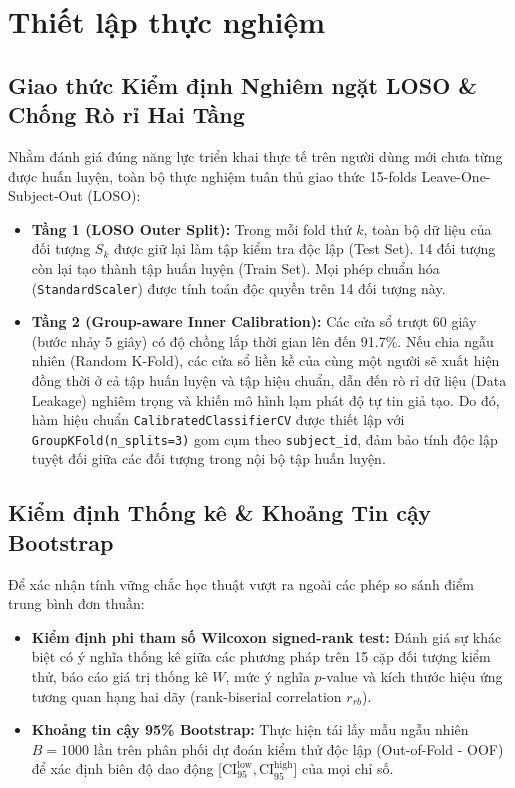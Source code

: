 \documentclass[conference]{IEEEtran}
\begin{document}
\section{Thiết lập thực nghiệm}

\subsection{Giao thức Kiểm định Nghiêm ngặt LOSO \& Chống Rò rỉ Hai Tầng}
Nhằm đánh giá đúng năng lực triển khai thực tế trên người dùng mới chưa từng được huấn luyện, toàn bộ thực nghiệm tuân thủ giao thức 15-folds Leave-One-Subject-Out (LOSO):
\begin{itemize}
    \item \textbf{Tầng 1 (LOSO Outer Split):} Trong mỗi fold thứ $k$, toàn bộ dữ liệu của đối tượng $S_k$ được giữ lại làm tập kiểm tra độc lập (Test Set). 14 đối tượng còn lại tạo thành tập huấn luyện (Train Set). Mọi phép chuẩn hóa (\texttt{StandardScaler}) được tính toán độc quyền trên 14 đối tượng này.
    \item \textbf{Tầng 2 (Group-aware Inner Calibration):} Các cửa sổ trượt 60 giây (bước nhảy 5 giây) có độ chồng lắp thời gian lên đến 91.7\%. Nếu chia ngẫu nhiên (Random K-Fold), các cửa sổ liền kề của cùng một người sẽ xuất hiện đồng thời ở cả tập huấn luyện và tập hiệu chuẩn, dẫn đến rò rỉ dữ liệu (Data Leakage) nghiêm trọng và khiến mô hình lạm phát độ tự tin giả tạo. Do đó, hàm hiệu chuẩn \texttt{CalibratedClassifierCV} được thiết lập với \texttt{GroupKFold(n\_splits=3)} gom cụm theo \texttt{subject\_id}, đảm bảo tính độc lập tuyệt đối giữa các đối tượng trong nội bộ tập huấn luyện.
\end{itemize}

\subsection{Kiểm định Thống kê \& Khoảng Tin cậy Bootstrap}
Để xác nhận tính vững chắc học thuật vượt ra ngoài các phép so sánh điểm trung bình đơn thuần:
\begin{itemize}
    \item \textbf{Kiểm định phi tham số Wilcoxon signed-rank test:} Đánh giá sự khác biệt có ý nghĩa thống kê giữa các phương pháp trên 15 cặp đối tượng kiểm thử, báo cáo giá trị thống kê $W$, mức ý nghĩa $p$-value và kích thước hiệu ứng tương quan hạng hai dãy (rank-biserial correlation $r_{rb}$).
    \item \textbf{Khoảng tin cậy 95\% Bootstrap:} Thực hiện tái lấy mẫu ngẫu nhiên $B = 1000$ lần trên phân phối dự đoán kiểm thử độc lập (Out-of-Fold - OOF) để xác định biên độ dao động [$\text{CI}_{95}^{\text{low}}, \text{CI}_{95}^{\text{high}}$] của mọi chỉ số.
\end{itemize}
\end{document}
